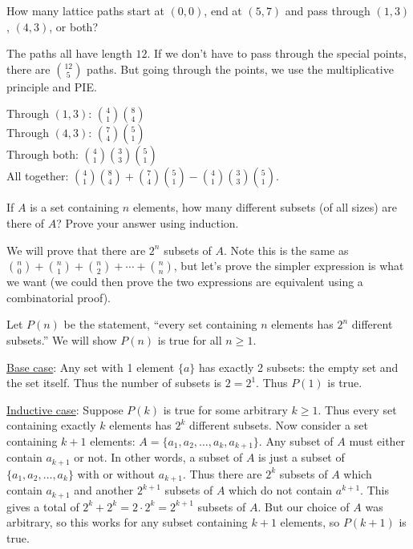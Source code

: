 \documentclass[11pt]{exam}
\begin{document}
\begin{questions}
\begin{solution}
\end{solution}


\question How many lattice paths start at $(0,0)$, end at $(5,7)$ and pass through $(1,3)$, $(4,3)$, or both?

\begin{solution}
The paths all have length $12$.  If we don't have to pass through the special points, there are ${12\choose 5}$ paths.  But going through the points, we use the multiplicative principle and PIE.

Through $(1,3)$: ${4 \choose 1}{8\choose 4}$\\
Through $(4,3)$: ${7 \choose 4}{5 \choose 1}$\\
Through both: ${4 \choose 1}{3 \choose 3}{5 \choose 1}$\\

All together: ${4 \choose 1}{8\choose 4} + {7 \choose 4}{5 \choose 1} - {4 \choose 1}{3 \choose 3}{5 \choose 1}$.
\end{solution}


\vfill



\question If $A$ is a set containing $n$ elements, how many different subsets (of all sizes) are there of $A$?  Prove your answer using induction.

	\begin{solution}
		We will prove that there are $2^n$ subsets of $A$.  Note this is the same as ${n\choose 0} + {n \choose 1} + {n \choose 2} + \cdots + {n\choose n}$, but let's prove the simpler expression is what we want (we could then prove the two expressions are equivalent using a combinatorial proof).

		Let $P(n)$ be the statement, ``every set containing $n$ elements has $2^n$ different subsets.''  We will show $P(n)$ is true for all $n \ge 1$.

		\underline{Base case}: Any set with 1 element $\{a\}$ has exactly 2 subsets: the empty set and the set itself.  Thus the number of subsets is $2= 2^1$.  Thus $P(1)$ is true.

		\underline{Inductive case}: Suppose $P(k)$ is true for some arbitrary $k \ge 1$.  Thus every set containing exactly $k$ elements has $2^k$ different subsets.  Now consider a set containing $k+1$ elements: $A = \{a_1, a_2, \ldots, a_k, a_{k+1}\}$.  Any subset of $A$ must either contain $a_{k+1}$ or not.  In other words, a subset of $A$ is just a subset of $\{a_1, a_2,\ldots, a_k\}$ with or without $a_{k+1}$.  Thus there are $2^k$ subsets of $A$ which contain $a_{k+1}$ and another $2^{k+1}$ subsets of $A$ which do not contain $a^{k+1}$.  This gives a total of $2^k + 2^k = 2\cdot 2^k = 2^{k+1}$ subsets of $A$.  But our choice of $A$ was arbitrary, so this works for any subset containing $k+1$ elements, so $P(k+1)$ is true.


\end{solution}
\end{questions}
\end{document}
